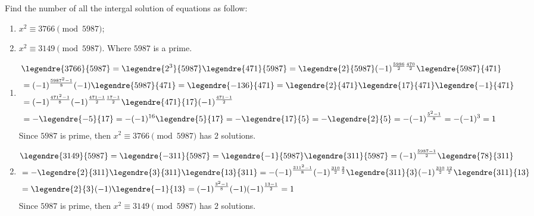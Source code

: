 \documentclass{ctexart}
\newif\ifpreface
\begin{document}
\large
\setlength{\baselineskip}{1.2em}
\ifpreface

\else
{}
\begin{problem}\label{pro:1}
  Find the number of all the intergal solution of equations as follow:
  \begin{enumerate}
    \item \(x^2 \equiv 3766 \pmod{5987}\);
    \item \(x^2 \equiv 3149 \pmod{5987}\).
      Where \(5987\) is a prime.
  \end{enumerate}
\end{problem}
\begin{solution}
\begin{enumerate}
  \item
    \begin{equation}
      \begin{aligned}
      &\legendre{3766}{5987}=\legendre{2^3}{5987}\legendre{471}{5987}=\legendre{2}{5987}(-1)^{\frac{5986}{2} \frac{470}{2}}\legendre{5987}{471}\\ 
      &=(-1)^{\frac{5987^2-1}{8}} (-1)\legendre{5987}{471}=\legendre{-136}{471}=\legendre{2}{471}\legendre{17}{471}\legendre{-1}{471}\\ 
      &=(-1)^{\frac{471^2-1}{8}}(-1)^{\frac{471-1}{2} \frac{17-1}{2}}\legendre{471}{17}(-1)^{\frac{471-1}{2}}\\ 
      &=-\legendre{-5}{17}=-(-1)^{16}\legendre{5}{17}=-\legendre{17}{5}=-\legendre{2}{5}=-(-1)^{\frac{5^2-1}{8}}=-(-1)^3=1
    \end{aligned}
    \end{equation}
    Since \(5987\) is prime, then \(x^2 \equiv 3766 \pmod{5987}\) has \(2\) solutions.
  \item 
    \begin{equation} 
      \begin{aligned}
        &\legendre{3149}{5987}=\legendre{-311}{5987}=\legendre{-1}{5987}\legendre{311}{5987}=(-1)^{\frac{5987-1}{2}}\legendre{78}{311}\\ 
        &=-\legendre{2}{311}\legendre{3}{311}\legendre{13}{311}=-(-1)^{\frac{311^2-1}{8}}(-1)^{\frac{310}{2} \frac{2}{2}}\legendre{311}{3}(-1)^{\frac{310}{2} \frac{12}{2}}\legendre{311}{13}\\ 
        &=\legendre{2}{3}(-1)\legendre{-1}{13}=(-1)^{\frac{3^2-1}{8}}(-1)(-1)^{\frac{13-1}{2}}=1
      \end{aligned}
    \end{equation}
    Since \(5987\) is prime, then \(x^2 \equiv 3149 \pmod{5987}\) has \(2\) solutions.
\end{enumerate}
\end{solution}
\end{document}
